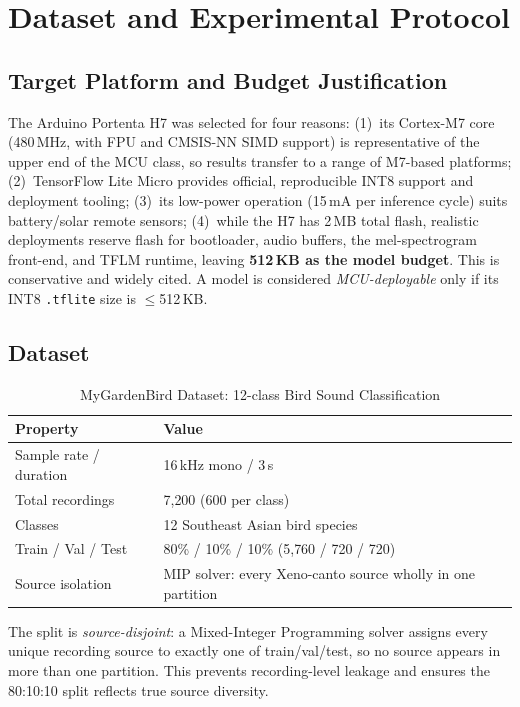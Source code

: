 \documentclass[conference]{IEEEtran}
\begin{document}
\section{Dataset and Experimental Protocol}

\subsection{Target Platform and Budget Justification}

The Arduino Portenta H7 was selected for four reasons: (1)~its Cortex-M7 core (480\,MHz, with FPU and CMSIS-NN SIMD support) is representative of the upper end of the MCU class, so results transfer to a range of M7-based platforms; (2)~TensorFlow Lite Micro provides official, reproducible INT8 support and deployment tooling; (3)~its low-power operation (15\,mA per inference cycle) suits battery/solar remote sensors; (4)~while the H7 has 2\,MB total flash, realistic deployments reserve flash for bootloader, audio buffers, the mel-spectrogram front-end, and TFLM runtime, leaving \textbf{512\,KB as the model budget}. This is conservative and widely cited. A model is considered \emph{MCU-deployable} only if its INT8 \texttt{.tflite} size is $\le$512\,KB.

\subsection{Dataset}

\begin{table}[h]
\centering
\caption{MyGardenBird Dataset: 12-class Bird Sound Classification}
\begin{tabular}{ll}
\toprule
\textbf{Property} & \textbf{Value} \\
\midrule
Sample rate / duration & 16\,kHz mono / 3\,s \\
Total recordings & 7{,}200 (600 per class) \\
Classes & 12 Southeast Asian bird species \\
Train / Val / Test & 80\% / 10\% / 10\% (5{,}760 / 720 / 720) \\
Source isolation & MIP solver: every Xeno-canto source wholly in one partition \\
\bottomrule
\end{tabular}
\label{tab:dataset}
\end{table}

The split is \emph{source-disjoint}: a Mixed-Integer Programming solver assigns every unique recording source to exactly one of train/val/test, so no source appears in more than one partition. This prevents recording-level leakage and ensures the 80:10:10 split reflects true source diversity.
\end{document}
